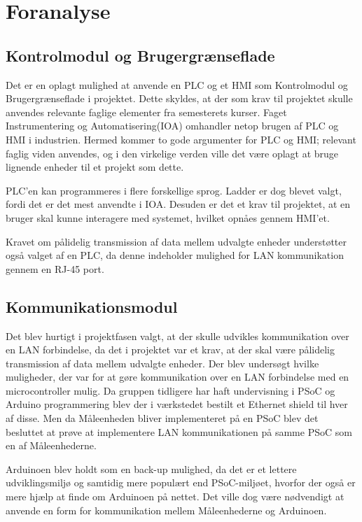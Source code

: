 
\section{Foranalyse}

\subsection{Kontrolmodul og Brugergrænseflade}
Det er en oplagt mulighed at anvende en PLC og et HMI som Kontrolmodul og Brugergrænseflade i projektet. Dette skyldes, at der som krav til projektet skulle anvendes relevante faglige elementer fra semesterets kurser. Faget Instrumentering og Automatisering(IOA) omhandler netop brugen af PLC og HMI i industrien. Hermed kommer to gode argumenter for PLC og HMI; relevant faglig viden anvendes, og i den virkelige verden ville det være oplagt at bruge lignende enheder til et projekt som dette.


PLC'en kan programmeres i flere forskellige sprog. Ladder er dog blevet valgt, fordi det er det mest anvendte i IOA. Desuden er det et krav til projektet, at en bruger skal kunne interagere med systemet, hvilket opnåes gennem HMI'et.


Kravet om pålidelig transmission af data mellem udvalgte enheder understøtter også valget af en PLC, da denne indeholder mulighed for LAN kommunikation gennem en RJ-45 port.

\subsection{Kommunikationsmodul}
Det blev hurtigt i projektfasen valgt, at der skulle udvikles kommunikation over en LAN forbindelse, da det i projektet var et krav, at der skal være pålidelig transmission af data mellem udvalgte enheder. Der blev undersøgt hvilke muligheder, der var for at gøre kommunikation over en LAN forbindelse med en microcontroller mulig. Da gruppen tidligere har haft undervisning i PSoC og Arduino programmering blev der i værkstedet bestilt et Ethernet shield til hver af disse. Men da Måleenheden bliver implementeret på en PSoC blev det besluttet at prøve at implementere LAN kommunikationen på samme PSoC som en af Måleenhederne. 


Arduinoen blev holdt som en back-up mulighed, da det er et lettere udviklingsmiljø og samtidig mere populært end PSoC-miljøet, hvorfor der også er mere hjælp at finde om Arduinoen på nettet. Det ville dog være nødvendigt at anvende en form for kommunikation mellem Måleenhederne og Arduinoen. 






